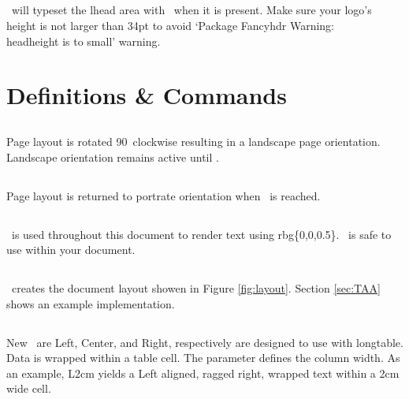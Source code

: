 \documentclass[12pt]{tlc-article}
\begin{document}

\subsection{\tlcLG}
\tlcA\ will typeset the lhead area with \tlcLG\ when it is present. Make sure
your logo's height is not larger than 34pt to avoid `Package Fancyhdr Warning:
\\headheight is to small' warning.


\clearpage
\section{Definitions \& Commands}
\subsection{\tlcBL}
Page layout is rotated 90\textdegree\ clockwise resulting in a landscape page
orientation.  Landscape orientation remains active until \tlcEL.

\subsection{\tlcEL}
Page layout is returned to portrate orientation when \tlcEL\ is reached.

\subsection{\tlcDB}
\tlcDB\ is used throughout this document to render text using rbg\{0,0,0.5\}. 
\tlcDB\ is safe to use within your document.

\subsection{\tlcTOC}
\tlcTOC\ creates the document layout showen in Figure \ref{fig:layout}.  Section
\ref{sec:TAA} shows an example implementation.

\subsection{\tlcNCT}
New \tlcNCT\ are Left, Center, and Right, respectively are
designed to use with longtable.  Data is wrapped within a table cell.   The
parameter defines the column width.  As an example, L{2cm} yields a Left
aligned, ragged right, wrapped text within a 2cm wide cell.  
\end{document}
